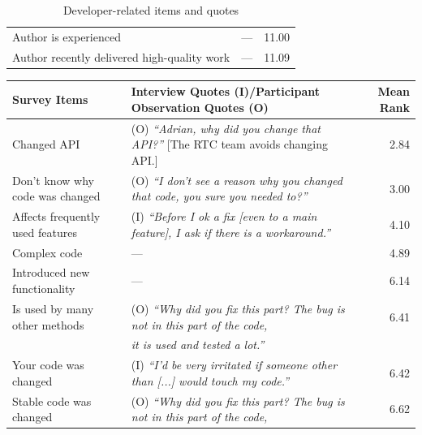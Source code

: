 \begin{table}
\begin{tabular}{l@{\hspace{5pt}}l@{\hspace{-10pt}}r}
Author is experienced &--- & 11.00\\%
Author recently delivered high-quality work &--- & 11.09\\%
\bottomrule
\end{tabular}
\label{tab:sub-social}
\caption{Developer-related items and quotes}
\end{table}

\begin{table}
\small
\centering
\begin{tabular}{l@{\hspace{-10pt}}l@{\hspace{-20pt}}r}
\toprule
Survey Items & Interview Quotes (I)/Participant Observation Quotes (O) & Mean Rank\\
\midrule
Changed API &(O) \emph{``Adrian, why did you change that API?''} [The RTC team avoids changing API.] & 2.84\\%
Don't know why code was changed &(O) \emph{``I don't see a reason why you changed that code, you sure you needed to?''}& 3.00\\%
Affects frequently used features &(I) \emph{``Before I ok a fix [even to a main feature], I ask if there is a workaround.''} & 4.10\\%
Complex code &--- & 4.89\\%
Introduced new functionality &--- & 6.14\\%
Is used by many other methods &(O) {\small\emph{``Why did you fix this part? The bug is not in this part of the code,}}& 6.41\\%
&\emph{ it is used and tested a lot.''}&\\
Your code was changed &(I) \emph{``I'd be very irritated if someone other than [...] would touch my code.''}& 6.42\\%
Stable code was changed &(O) {\small\emph{``Why did you fix this part? The bug is not in this part of the code, }}& 6.62\\%

\end{tabular}
\end{table}
